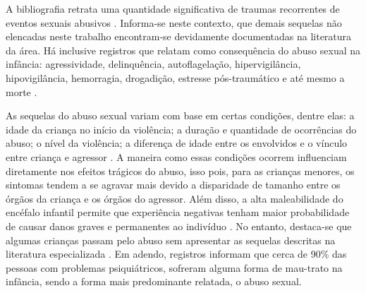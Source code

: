 \begin{parcolumns}{2}

\end{parcolumns}

\vspace{0.5 cm}

A bibliografia retrata uma quantidade significativa de traumas recorrentes de eventos sexuais abusivos \cite{pavao2013impasse, santos2011guia, deslandes2016atendimento, mariscal2003programa, acuna2014abuso, world2003guidelines}. Informa-se neste contexto, que demais sequelas não elencadas neste trabalho encontram-se devidamente documentadas na literatura da área. Há inclusive registros que relatam como consequência do abuso sexual na infância: agressividade, delinquência, autoflagelação, hipervigilância, hipovigilância, hemorragia, drogadição, estresse pós-traumático e até mesmo a morte \cite{meurer2017direitos}. 

As sequelas do abuso sexual variam com base em certas condições, dentre elas: a idade da criança no início da violência; a duração e quantidade de ocorrências do abuso; o nível da violência; a diferença de idade entre os envolvidos e o vínculo entre criança e agressor \cite{florentino2015possiveis}. A maneira como essas condições ocorrem influenciam diretamente nos efeitos trágicos do abuso, isso pois, para as crianças menores, os sintomas tendem a se agravar mais devido a disparidade de tamanho entre os órgãos da criança e os órgãos do agressor. Além disso, a alta maleabilidade do encéfalo infantil permite que experiência negativas tenham maior probabilidade de causar danos graves e permanentes ao indivíduo \cite{pereira2011crescimento}. No entanto, destaca-se que algumas crianças passam pelo abuso sem apresentar as sequelas descritas na literatura especializada \cite{aded2006abuso}. Em adendo, registros informam que cerca de 90\% das pessoas com problemas psiquiátricos, sofreram alguma forma de mau-trato na infância, sendo a forma mais predominante relatada, o abuso sexual. 

